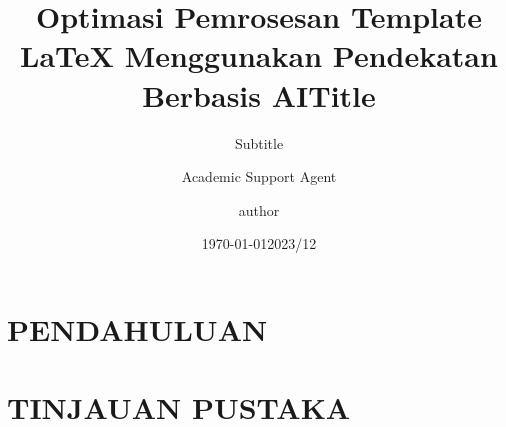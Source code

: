 \documentclass{beamer}
\title{Optimasi Pemrosesan Template LaTeX Menggunakan Pendekatan Berbasis AI}
\author{Academic Support Agent}
\date{\today}
\begin{document}
\maketitle

\begin{abstract}

\end{abstract}

\chapter{PENDAHULUAN}


\chapter{TINJAUAN PUSTAKA}


\usepackage{amsfonts,amsmath,oldgerm}
\usepackage{xeCJK}

\newcommand{\testcolor}[1]{\colorbox{#1}{\textcolor{#1}{test}}~\texttt{#1}}



\newcommand{\hrefcol}[2]{\textcolor{cyan}{\href{#1}{#2}}}

\title{Title}
\subtitle{Subtitle}
\author{author}
\date{2023/12}
\end{document}
